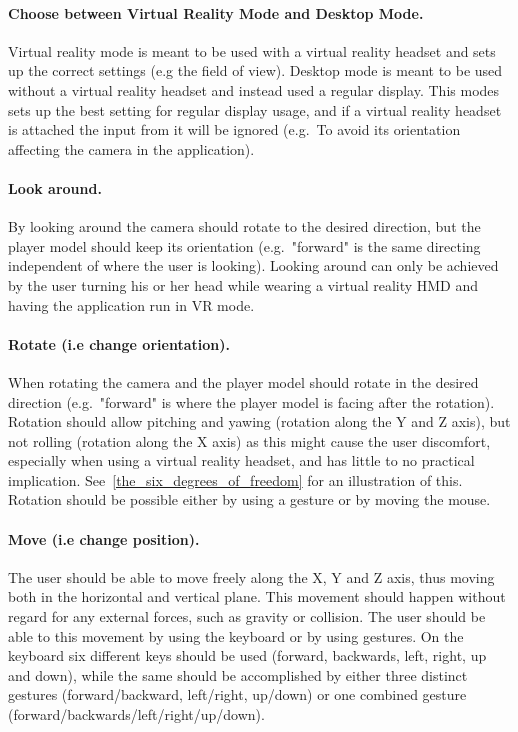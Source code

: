 \paragraph{Choose between Virtual Reality Mode and Desktop Mode.} Virtual reality mode is meant to be used with a virtual reality headset
and sets up the correct settings (e.g the field of view). Desktop mode is meant to be used without a virtual reality headset and instead used
a regular display. This modes sets up the best setting for regular display usage, and if a virtual reality headset is attached the input from it will be ignored 
(e.g.~To avoid its orientation affecting the camera in the application).

\paragraph{Look around.} By looking around the camera should rotate to the desired direction, but the player model should keep its orientation 
(e.g.~"forward" is the same directing independent of where the user is looking). Looking around can only be achieved by the user turning his or her 
head while wearing a virtual reality HMD and having the application run in VR mode.

\paragraph{Rotate (i.e change orientation).} When rotating the camera and the player model should rotate in the desired direction (e.g.~"forward" is where the player model is
facing after the rotation).
Rotation should allow pitching and yawing (rotation along the Y and Z axis), but not rolling (rotation along the X axis) as this might cause the user discomfort, especially when
using a virtual reality headset, and has little to no practical implication. See~\vref{the_six_degrees_of_freedom} for an illustration of this. 
Rotation should be possible either by using a gesture or by moving the mouse.

\paragraph{Move (i.e change position).} The user should be able to move freely along the X, Y and Z axis, thus moving both in the horizontal and vertical plane. 
This movement should happen without regard for any external forces, such as gravity or collision. The user should be able to this movement by using the keyboard or 
by using gestures. On the keyboard six different keys should be used (forward, backwards, left, right, up and down), while the same should be accomplished by
either three distinct gestures (forward/backward, left/right, up/down) or one combined gesture (forward/backwards/left/right/up/down).

